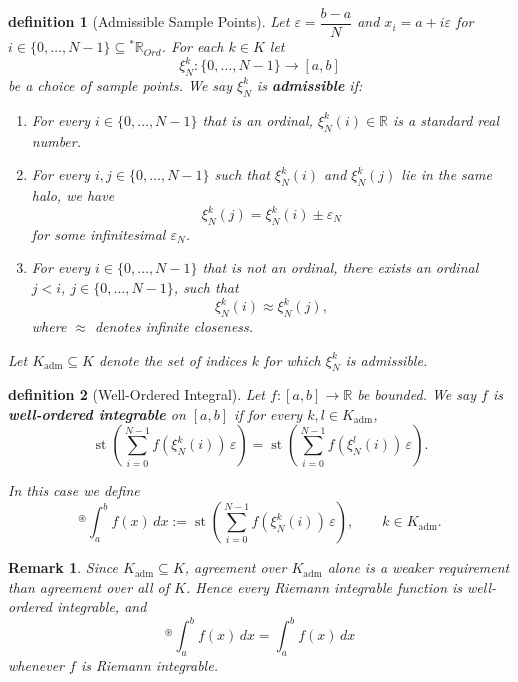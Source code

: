 \documentclass[10pt,a4paper]{book}
\newtheorem{definition}{definition}[section]
\newtheorem{remark}{Remark}[section]
\begin{document}
\begin{definition}[Admissible Sample Points]
    Let $\varepsilon=\dfrac{b-a}{N}$ and $x_i=a+i\varepsilon$ for $i\in\{0,\ldots,N-1\}\subseteq{}^*\mathbb{R}_{Ord}$. For each $k\in K$ let
    $$
        \xi_N^k:\{0,\ldots,N-1\}\to[a,b]
    $$
    be a choice of sample points. We say $\xi_N^k$ is \textbf{admissible} if:

    \begin{enumerate}
        \item For every $i\in\{0,\ldots,N-1\}$ that is an ordinal, $\xi_N^k(i)\in\mathbb{R}$
              is a standard real number.
        \item For every $i,j\in\{0,\ldots,N-1\}$ such that $\xi_N^k(i)$ and $\xi_N^k(j)$ lie
              in the same halo, we have $$ \xi_N^k(j)=\xi_N^k(i)\pm\varepsilon_N $$ for some
              infinitesimal $\varepsilon_N$.
        \item For every $i\in\{0,\ldots,N-1\}$ that is not an ordinal, there exists an
              ordinal $j<i$, $j\in\{0,\ldots,N-1\}$, such that $$
                  \xi_N^k(i)\approx\xi_N^k(j), $$ where $\approx$ denotes infinite closeness.
    \end{enumerate}

    Let $K_{\mathrm{adm}}\subseteq K$ denote the set of indices $k$ for which
    $\xi_N^k$ is admissible.
\end{definition}

\begin{definition}[Well-Ordered Integral]
    Let $f:[a,b]\to\mathbb{R}$ be bounded. We say $f$ is \textbf{well-ordered integrable} on $[a,b]$ if for every $k,l\in K_{\mathrm{adm}}$,
    $$
        \operatorname{st}\left(\sum_{i=0}^{N-1} f(\xi_N^k(i))\,\varepsilon\right)
        =
        \operatorname{st}\left(\sum_{i=0}^{N-1} f(\xi_N^l(i))\,\varepsilon\right).
    $$

    In this case we define $$ {}^\circledast\!\int_a^b f(x)\,dx :=
        \operatorname{st}\left(\sum_{i=0}^{N-1} f(\xi_N^k(i))\,\varepsilon\right),
        \qquad k\in K_{\mathrm{adm}}. $$
\end{definition}

\begin{remark}
    Since $K_{\mathrm{adm}}\subseteq K$, agreement over $K_{\mathrm{adm}}$ alone is a weaker requirement than agreement over all of $K$. Hence every Riemann integrable function is well-ordered integrable, and
    $$
        {}^\circledast\!\int_a^b f(x)\,dx = \int_a^b f(x)\,dx
    $$
    whenever $f$ is Riemann integrable.
\end{remark}
\end{document}
